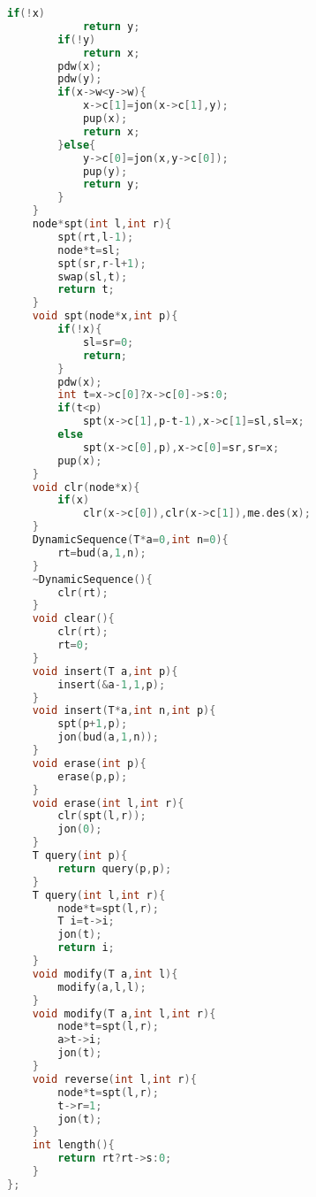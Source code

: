 \documentclass{book}
\begin{document}
\begin{lstlisting}[language=C++,title={Dynamic Sequence (Treap).hpp (4119 bytes, 177 lines)}]
        if(!x)
            return y;
        if(!y)
            return x;
        pdw(x);
        pdw(y);
        if(x->w<y->w){
            x->c[1]=jon(x->c[1],y);
            pup(x);
            return x;
        }else{
            y->c[0]=jon(x,y->c[0]);
            pup(y);
            return y;
        }
    }
    node*spt(int l,int r){
        spt(rt,l-1);
        node*t=sl;
        spt(sr,r-l+1);
        swap(sl,t);
        return t;
    }
    void spt(node*x,int p){
        if(!x){
            sl=sr=0;
            return;
        }
        pdw(x);
        int t=x->c[0]?x->c[0]->s:0;
        if(t<p)
            spt(x->c[1],p-t-1),x->c[1]=sl,sl=x;
        else
            spt(x->c[0],p),x->c[0]=sr,sr=x;
        pup(x);
    }
    void clr(node*x){
        if(x)
            clr(x->c[0]),clr(x->c[1]),me.des(x);
    }
    DynamicSequence(T*a=0,int n=0){
        rt=bud(a,1,n);
    }
    ~DynamicSequence(){
        clr(rt);
    }
    void clear(){
        clr(rt);
        rt=0;
    }
    void insert(T a,int p){
        insert(&a-1,1,p);
    }
    void insert(T*a,int n,int p){
        spt(p+1,p);
        jon(bud(a,1,n));
    }
    void erase(int p){
        erase(p,p);
    }
    void erase(int l,int r){
        clr(spt(l,r));
        jon(0);
    }
    T query(int p){
        return query(p,p);
    }
    T query(int l,int r){
        node*t=spt(l,r);
        T i=t->i;
        jon(t);
        return i;
    }
    void modify(T a,int l){
        modify(a,l,l);
    }
    void modify(T a,int l,int r){
        node*t=spt(l,r);
        a>t->i;
        jon(t);
    }
    void reverse(int l,int r){
        node*t=spt(l,r);
        t->r=1;
        jon(t);
    }
    int length(){
        return rt?rt->s:0;
    }
};
\end{lstlisting}
\end{document}

